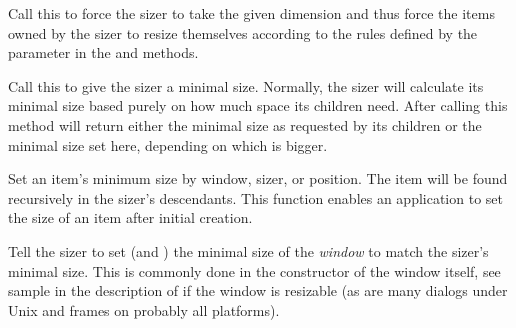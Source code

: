 
Call this to force the sizer to take the given dimension and thus force the items owned
by the sizer to resize themselves according to the rules defined by the parameter in the 
 and  methods.

\label{wxsizersetminsize}



Call this to give the sizer a minimal size. Normally, the sizer will calculate its
minimal size based purely on how much space its children need. After calling this
method  will return either the minimal size
as requested by its children or the minimal size set here, depending on which is
bigger.

\label{wxsizersetitemminsize}




Set an item's minimum size by window, sizer, or position. The item will be found recursively
in the sizer's descendants. This function enables an application to set the size of an item
after initial creation.

\label{wxsizersetsizehints}


Tell the sizer to set (and ) the minimal size of the {\it window} to
match the sizer's minimal size.  This is commonly done in the constructor of the window itself,
see sample in the description of  if the window is resizable
(as are many dialogs under Unix and frames on probably all platforms).

\label{wxsizersetvirtualsizehints}


